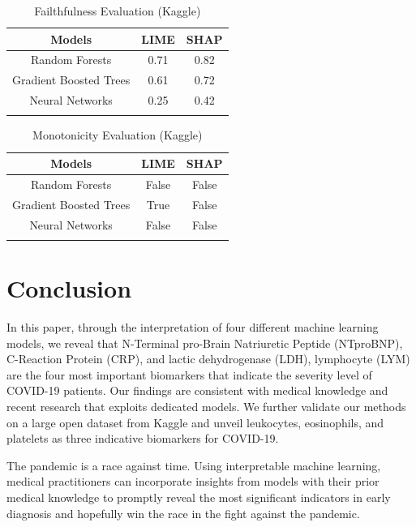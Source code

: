 \begin{table}[H]
\centering
\caption{Failthfulness Evaluation (Kaggle)}
\begin{tabular}{@{}ccc@{}}
\toprule
Models   & LIME & SHAP \\ \midrule
Random Forests & 0.71  & 0.82      \\
Gradient Boosted Trees & 0.61 & 0.72 \\
Neural Networks & 0.25 & 0.42 \\ \bottomrule
\label{kaggle_faith}
\end{tabular}
\end{table}

\begin{table}[H]
\centering
\caption{Monotonicity Evaluation (Kaggle)}
\begin{tabular}{@{}ccc@{}}
\toprule
Models   & LIME & SHAP \\ \midrule
Random Forests & False  & False      \\
Gradient Boosted Trees & True & False \\
Neural Networks & False & False \\ \bottomrule
\label{kaggle_mono}
\end{tabular}
\end{table}

\section{Conclusion}

In this paper, through the interpretation of four different machine learning models, we reveal that N-Terminal pro-Brain Natriuretic Peptide (NTproBNP), C-Reaction Protein (CRP), and lactic dehydrogenase (LDH), lymphocyte (LYM) are the four most important biomarkers that indicate the severity level of COVID-19 patients. Our findings are consistent with medical knowledge and recent research that exploits dedicated models. We further validate our methods on a large open dataset from Kaggle and unveil leukocytes, eosinophils, and platelets as three indicative biomarkers for COVID-19.

The pandemic is a race against time. Using interpretable machine learning, medical practitioners can incorporate insights from models with their prior medical knowledge to promptly reveal the most significant indicators in early diagnosis and hopefully win the race in the fight against the pandemic.


